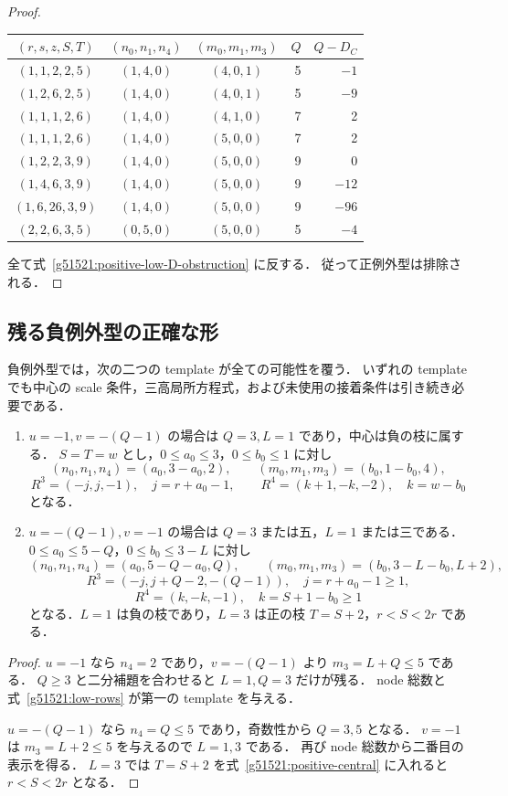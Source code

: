 \begin{proof}
\begin{center}\small
\begin{tabular}{c|c|c|r|r}
$(r,s,z,S,T)$&$(n_0,n_1,n_4)$&$(m_0,m_1,m_3)$&$Q$&$Q-D_C$\\\hline
$(1,1,2,2,5)$&$(1,4,0)$&$(4,0,1)$&5&$-1$\\
$(1,2,6,2,5)$&$(1,4,0)$&$(4,0,1)$&5&$-9$\\
$(1,1,1,2,6)$&$(1,4,0)$&$(4,1,0)$&7&2\\
$(1,1,1,2,6)$&$(1,4,0)$&$(5,0,0)$&7&2\\
$(1,2,2,3,9)$&$(1,4,0)$&$(5,0,0)$&9&0\\
$(1,4,6,3,9)$&$(1,4,0)$&$(5,0,0)$&9&$-12$\\
$(1,6,26,3,9)$&$(1,4,0)$&$(5,0,0)$&9&$-96$\\
$(2,2,6,3,5)$&$(0,5,0)$&$(5,0,0)$&5&$-4$
\end{tabular}
\end{center}
全て式~\eqref{g51521:positive-low-D-obstruction} に反する．
従って正例外型は排除される．
\end{proof}

\subsection{残る負例外型の正確な形}

\begin{proposition}\label{g51521:negative-templates}
負例外型では，次の二つの template が全ての可能性を覆う．
いずれの template でも中心の scale 条件，三高局所方程式，および未使用の接着条件は引き続き必要である．
\begin{enumerate}
\item $u=-1,v=-(Q-1)$ の場合は $Q=3,L=1$ であり，中心は負の枝に属する．
$S=T=w$ とし，$0\le a_0\le3$，$0\le b_0\le1$ に対し
\[
 (n_0,n_1,n_4)=(a_0,3-a_0,2),\qquad
 (m_0,m_1,m_3)=(b_0,1-b_0,4),
\]
\[
 R^3=(-j,j,-1),\quad j=r+a_0-1,\qquad
 R^4=(k+1,-k,-2),\quad k=w-b_0
\]
となる．
\item $u=-(Q-1),v=-1$ の場合は $Q=3$ または五，$L=1$ または三である．
$0\le a_0\le5-Q$，$0\le b_0\le3-L$ に対し
\[
 (n_0,n_1,n_4)=(a_0,5-Q-a_0,Q),\qquad
 (m_0,m_1,m_3)=(b_0,3-L-b_0,L+2),
\]
\[
 R^3=(-j,j+Q-2,-(Q-1)),\quad j=r+a_0-1\ge1,
\]
\[
 R^4=(k,-k,-1),\quad k=S+1-b_0\ge1
\]
となる．$L=1$ は負の枝であり，$L=3$ は正の枝
$T=S+2$，$r<S<2r$ である．
\end{enumerate}
\end{proposition}
\begin{proof}
$u=-1$ なら $n_4=2$ であり，$v=-(Q-1)$ より $m_3=L+Q\le5$ である．
$Q\ge3$ と二分補題を合わせると $L=1,Q=3$ だけが残る．
node 総数と式~\eqref{g51521:low-rows} が第一の template を与える．

$u=-(Q-1)$ なら $n_4=Q\le5$ であり，奇数性から $Q=3,5$ となる．
$v=-1$ は $m_3=L+2\le5$ を与えるので $L=1,3$ である．
再び node 総数から二番目の表示を得る．
$L=3$ では $T=S+2$ を式~\eqref{g51521:positive-central} に入れると $r<S<2r$ となる．
\end{proof}

